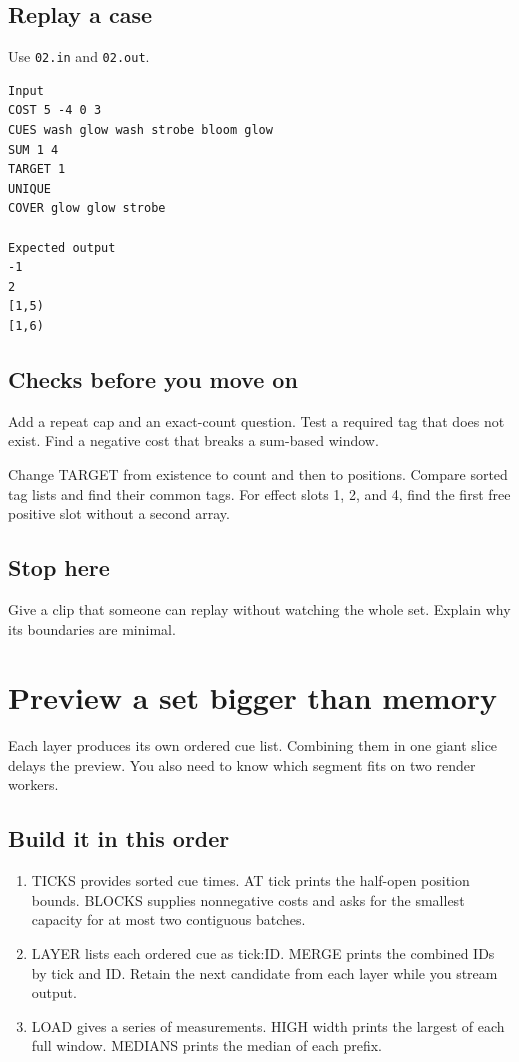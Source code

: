 \documentclass[11pt,letterpaper]{article}
\begin{document}
\subsection*{Replay a case}

Use \texttt{02.in} and \texttt{02.out}.

\begin{samepage}
\small
\begin{verbatim}
Input
COST 5 -4 0 3
CUES wash glow wash strobe bloom glow
SUM 1 4
TARGET 1
UNIQUE
COVER glow glow strobe

Expected output
-1
2
[1,5)
[1,6)
\end{verbatim}
\end{samepage}

\subsection*{Checks before you move on}

Add a repeat cap and an exact-count question. Test a required tag that does not exist. Find a negative cost that breaks a sum-based window.

Change TARGET from existence to count and then to positions. Compare sorted tag lists and find their common tags. For effect slots 1, 2, and 4, find the first free positive slot without a second array.

\subsection*{Stop here}

Give a clip that someone can replay without watching the whole set. Explain why its boundaries are minimal.

\clearpage

\section{Preview a set bigger than memory}\label{visuals:03}

Each layer produces its own ordered cue list. Combining them in one giant slice delays the preview. You also need to know which segment fits on two render workers.

\subsection*{Build it in this order}

\begin{enumerate}
\item TICKS provides sorted cue times. AT tick prints the half-open position bounds. BLOCKS supplies nonnegative costs and asks for the smallest capacity for at most two contiguous batches.
\item LAYER lists each ordered cue as tick:ID. MERGE prints the combined IDs by tick and ID. Retain the next candidate from each layer while you stream output.
\item LOAD gives a series of measurements. HIGH width prints the largest of each full window. MEDIANS prints the median of each prefix.
\end{enumerate}
\end{document}
